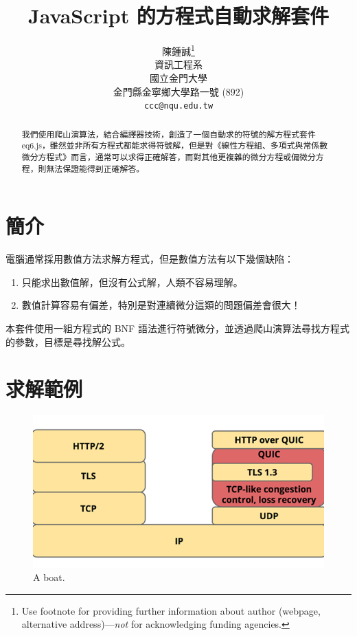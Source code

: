 \documentclass{article}
\title{JavaScript 的方程式自動求解套件}
\author{
  陳鍾誠\thanks{Use footnote for providing further
    information about author (webpage, alternative
    address)---\emph{not} for acknowledging funding agencies.} \\
  資訊工程系\\
  國立金門大學\\
  金門縣金寧鄉大學路一號 (892) \\
  \texttt{ccc@nqu.edu.tw} \\
}
\begin{document}
\maketitle

\begin{abstract}
我們使用爬山演算法，結合編譯器技術，創造了一個自動求的符號的解方程式套件 eq6.js，雖然並非所有方程式都能求得符號解，但是對《線性方程組、多項式與常係數微分方程式》而言，通常可以求得正確解答，而對其他更複雜的微分方程或偏微分方程，則無法保證能得到正確解答。
\end{abstract}




\section{簡介}

電腦通常採用數值方法求解方程式，但是數值方法有以下幾個缺陷：

\begin{enumerate}
  \item  只能求出數值解，但沒有公式解，人類不容易理解。
  \item 數值計算容易有偏差，特別是對連續微分這類的問題偏差會很大！
\end{enumerate}

本套件使用一組方程式的 BNF 語法進行符號微分，並透過爬山演算法尋找方程式的參數，目標是尋找解公式。


\section{求解範例}
\label{sec:headings}


\begin{figure}
  \includegraphics[width=\linewidth]{http.png}
  \caption{A boat.}
  \label{fig:boat1}
\end{figure}
\end{document}
